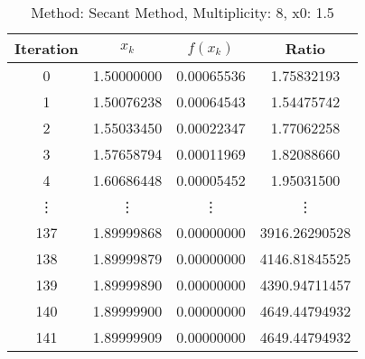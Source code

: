\begin{table}
\centering
\caption{Method: Secant Method, Multiplicity: 8, x0: 1.5}
\label{tab:table_Secant_Method_8_1_5}
\begin{tabular}{c c c c}
\toprule
Iteration &      $x_k$ &   $f(x_k)$ &         Ratio \\
\midrule
        0 & 1.50000000 & 0.00065536 &    1.75832193 \\
        1 & 1.50076238 & 0.00064543 &    1.54475742 \\
        2 & 1.55033450 & 0.00022347 &    1.77062258 \\
        3 & 1.57658794 & 0.00011969 &    1.82088660 \\
        4 & 1.60686448 & 0.00005452 &    1.95031500 \\
   \vdots &     \vdots &     \vdots &        \vdots \\
      137 & 1.89999868 & 0.00000000 & 3916.26290528 \\
      138 & 1.89999879 & 0.00000000 & 4146.81845525 \\
      139 & 1.89999890 & 0.00000000 & 4390.94711457 \\
      140 & 1.89999900 & 0.00000000 & 4649.44794932 \\
      141 & 1.89999909 & 0.00000000 & 4649.44794932 \\
\bottomrule
\end{tabular}
\end{table}
